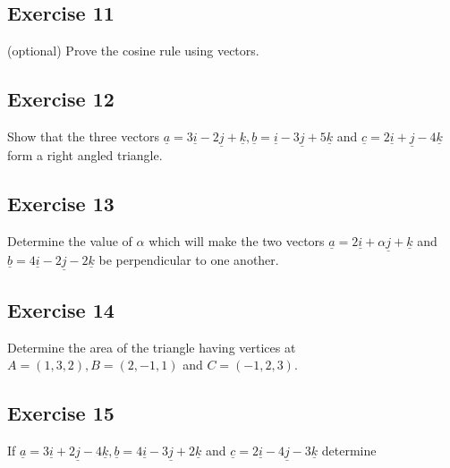 \documentclass[
  11pt,
  oneside]{book}
\newcommand{\slide}{}
\theoremstyle{definition}
\theoremstyle{definition}
\theoremstyle{definition}
\theoremstyle{definition}
\theoremstyle{remark}
\begin{document}
\slide

\subsection*{Exercise 11}\label{exercise-11-1}

(optional) Prove the cosine rule using vectors.

\slide

\subsection*{Exercise 12}\label{exercise-12}

Show that the three vectors \(\underline{a} = 3\underline{i} - 2\underline{j} + \underline{k}, \underline{b} = \underline{i} - 3\underline{j} + 5\underline{k}\) and \(\underline{c}= 2\underline{i} + \underline{j} - 4\underline{k}\) form a right angled triangle.

\slide

\subsection*{Exercise 13}\label{exercise-13}

Determine the value of \(\alpha\) which will make the two vectors \(\underline{a} = 2\underline{i} + \alpha\underline{j} + \underline{k}\) and \(\underline{b} = 4\underline{i} - 2\underline{j} - 2\underline{k}\) be perpendicular to one another.

\slide

\subsection*{Exercise 14}\label{exercise-14}

Determine the area of the triangle having vertices at \(A=(1,3,2), B=(2, -1,1)\) and \(C=(-1,2,3)\).

\slide

\subsection*{Exercise 15}\label{exercise-15}

If \(\underline{a} = 3\underline{i} + 2\underline{j} - 4\underline{k}, \underline{b} = 4\underline{i} - 3\underline{j} + 2\underline{k}\) and \(\underline{c} = 2\underline{i} - 4\underline{j} - 3\underline{k}\) determine
\end{document}
